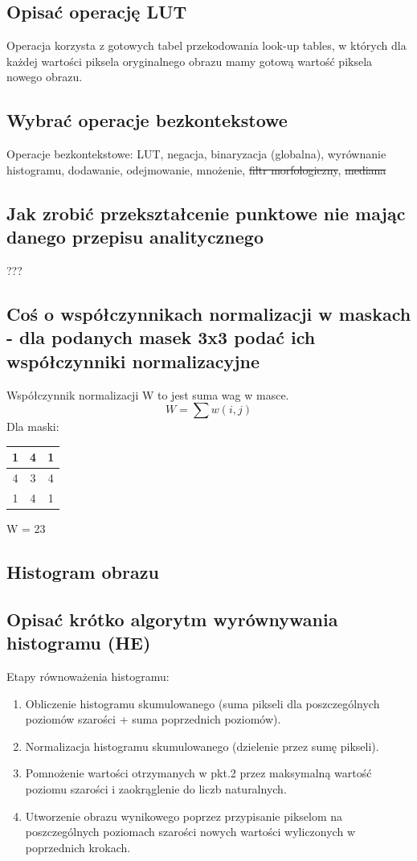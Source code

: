 \documentclass[a4paper, 12pt, titlepage]{article}
\begin{document}
\subsection{Opisać operację LUT}
Operacja korzysta z gotowych tabel przekodowania look-up tables, w których dla każdej wartości piksela oryginalnego obrazu mamy gotową wartość piksela nowego obrazu.

\subsection{Wybrać operacje bezkontekstowe}
Operacje bezkontekstowe: LUT, negacja, binaryzacja (globalna), wyrównanie histogramu, dodawanie, odejmowanie, mnożenie, \st{filtr morfologiczny}, \st{mediana}

\subsection{Jak zrobić przekształcenie punktowe nie mając danego przepisu analitycznego}
???

\subsection{Coś o współczynnikach normalizacji w maskach - dla podanych masek 3x3 podać ich współczynniki normalizacyjne}
Współczynnik normalizacji W to jest suma wag w masce.
$$ W = \sum w(i,j) $$
Dla maski: 
\begin{tabular}{|c|c|c|}
	\hline
	1 & 4 & 1 \\ \hline
	4 & 3 & 4 \\ \hline
	1 & 4 & 1 \\ \hline
\end{tabular} W = 23 
\pagebreak\subsection{Histogram obrazu}

\subsection{Opisać krótko algorytm wyrównywania histogramu (HE)}
Etapy równoważenia histogramu:
\begin{enumerate}
	\item Obliczenie histogramu skumulowanego (suma pikseli dla poszczególnych poziomów szarości + suma poprzednich poziomów).
	\item Normalizacja histogramu skumulowanego (dzielenie przez sumę pikseli).
	\item Pomnożenie wartości otrzymanych w pkt.2 przez maksymalną wartość poziomu szarości i zaokrąglenie do liczb naturalnych.
	\item Utworzenie obrazu wynikowego poprzez przypisanie pikselom na poszczególnych poziomach szarości nowych wartości wyliczonych w poprzednich krokach.
\end{enumerate}
\end{document}
